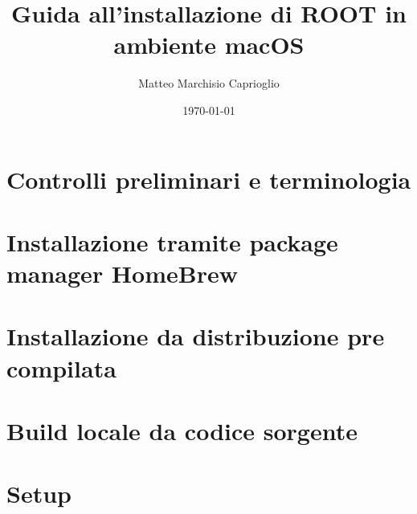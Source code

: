 \documentclass[12pt,a4paper]{article}
\title{Guida all'installazione di ROOT in ambiente macOS}
\author{Matteo Marchisio Caprioglio}
\date{\today}
\begin{document}
\maketitle
\newpage

\begin{abstract}
	
\end{abstract}

\newpage

\tableofcontents

\newpage

\section{Controlli preliminari e terminologia}
\label{sec:prelim}



\section{Installazione tramite package manager HomeBrew}
\label{brew}


\section{Installazione da distribuzione pre compilata}
\label{sec:pre-comp}


\section{Build locale da codice sorgente}
\label{sec:build}


\section{Setup}
\label{sec:setup}



\newpage

\begin{comment}
\section{Documentazione}
\begin{itemize}
	\item \hyperref{https://root.cern}{}{}{Sito di ROOT - documentazione completa}
	\item \hyperref{https://root.cern/install/all_releases/}{}{}{Releases di ROOT}
	\item \hyperref{https://www.howtogeek.com/444596/how-to-change-the-default-shell-to-bash-in-macos-catalina/}{}{}{Come cambiare la shell di default di macOS}
	\item \hyperref{https://www.gnu.org/savannah-checkouts/gnu/bash/manual/bash.html#Controlling-the-Prompt}{}{}{Manuale comandi shell}
	\item \hyperref{https://wiki.gentoo.org/wiki/Vim/Guide}{}{}{Guida Vim}
\end{itemize}
\end{comment}



\end{document}
